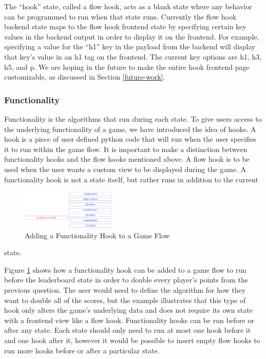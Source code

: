 \documentclass{article}
\begin{document}
            The ``hook'' state, called a flow hook, acts as a blank state where any behavior can be programmed to run when that state runs. Currently the flow hook backend state maps to the flow hook frontend state by specifying certain key values in the backend output in order to display it on the frontend. For example, specifying a value for the ``h1'' key in the payload from the backend will display that key's value in an h1 tag on the frontend. The current key options are h1, h3, h5, and p. We are hoping in the future to make the entire hook frontend page customizable, as discussed in Section \ref{future-work}.
        
        \subsubsection{Functionality}\label{functionality}
            Functionality is the algorithms that run during each state. To give users access to the underlying functionality of a game, we have introduced the idea of hooks. A hook is a piece of user defined python code that will run when the user specifies it to run within the game flow. It is important to make a distinction between functionality hooks and the flow hooks mentioned above. A flow hook is to be used when the user wants a custom view to be displayed during the game. A functionality hook is not a state itself, but rather runs in addition to the current
            \begin{figure}
                \centering
                \includegraphics[width=0.40\textwidth]{images/architecture-hook.png}
                \caption{Adding a Functionality Hook to a Game Flow}
                \label{fig:functionality-hook}
            \end{figure}
            state.
            
            Figure \ref{fig:functionality-hook} shows how a functionality hook can be added to a game flow to run before the leaderboard state in order to double every player's points from the previous question. The user would need to define the algorithm for how they want to double all of the scores, but the example illustrates that this type of hook only alters the game's underlying data and does not require its own state with a frontend view like a flow hook. Functionality hooks can be run before or after any state. Each state should only need to run at most one hook before it and one hook after it, however it would be possible to insert empty flow hooks to run more hooks before or after a particular state.
\end{document}
